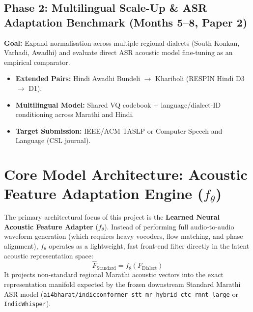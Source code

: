 \documentclass[11pt]{article}
\begin{document}
\subsection{Phase 2: Multilingual Scale-Up \& ASR Adaptation Benchmark (Months 5--8, Paper 2)}
\textbf{Goal:} Expand normalisation across multiple regional dialects (South Konkan, Varhadi, Awadhi) and evaluate direct ASR acoustic model fine-tuning as an empirical comparator.
\begin{itemize}[leftmargin=*]
  \item \textbf{Extended Pairs:} Hindi Awadhi Bundeli $\rightarrow$ Khariboli (RESPIN Hindi D3 $\rightarrow$ D1).
  \item \textbf{Multilingual Model:} Shared VQ codebook + language/dialect-ID conditioning across Marathi and Hindi.
  \item \textbf{Target Submission:} IEEE/ACM TASLP or Computer Speech and Language (CSL journal).
\end{itemize}

\section{Core Model Architecture: Acoustic Feature Adaptation Engine (\texorpdfstring{$f_\theta$}{f\_theta})}

The primary architectural focus of this project is the \textbf{Learned Neural Acoustic Feature Adapter} ($f_\theta$). Instead of performing full audio-to-audio waveform generation (which requires heavy vocoders, flow matching, and phase alignment), $f_\theta$ operates as a lightweight, fast front-end filter directly in the latent acoustic representation space:
\[
\hat{F}_{\text{Standard}} = f_\theta(F_{\text{Dialect}})
\]
It projects non-standard regional Marathi acoustic vectors into the exact representation manifold expected by the frozen downstream Standard Marathi ASR model (\texttt{ai4bharat/indicconformer\_stt\_mr\_hybrid\_ctc\_rnnt\_large} or \texttt{IndicWhisper}).
\end{document}
